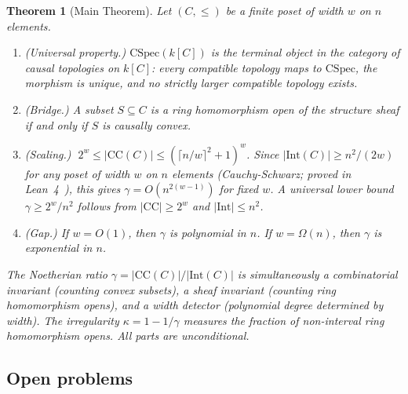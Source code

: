 \documentclass[11pt,a4paper]{article}
\theoremstyle{plain}
\newtheorem{theorem}{Theorem}[section]
\theoremstyle{definition}
\theoremstyle{remark}
\newcommand{\CSpec}{\mathrm{CSpec}}
\newcommand{\CC}{\mathrm{CC}}
\newcommand{\Int}{\mathrm{Int}}
\begin{document}
\begin{theorem}[Main Theorem]\label{thm:main}
Let $(C, \leq)$ be a finite poset of width $w$ on $n$ elements.
\begin{enumerate}[nosep]
\item \textup{(Universal property.)} $\CSpec(k[C])$ is the terminal object in the category of causal topologies on $k[C]$: every compatible topology maps to $\CSpec$, the morphism is unique, and no strictly larger compatible topology exists.
\item \textup{(Bridge.)} A subset $S \subseteq C$ is a ring homomorphism open of the structure sheaf if and only if $S$ is causally convex.
\item \textup{(Scaling.)} $\;2^w \leq |\CC(C)| \leq (\lceil n/w \rceil^2 + 1)^w$. Since $|\Int(C)| \geq n^2/(2w)$ for any poset of width $w$ on $n$ elements (Cauchy-Schwarz; proved in Lean~4~\cite{leanrepo}), this gives $\gamma = O(n^{2(w-1)})$ for fixed $w$. A universal lower bound $\gamma \geq 2^w / n^2$ follows from $|\CC| \geq 2^w$ and $|\Int| \leq n^2$.
\item \textup{(Gap.)} If $w = O(1)$, then $\gamma$ is polynomial in $n$. If $w = \Omega(n)$, then $\gamma$ is exponential in $n$.
\end{enumerate}
The Noetherian ratio $\gamma = |\CC(C)|/|\Int(C)|$ is simultaneously a combinatorial invariant (counting convex subsets), a sheaf invariant (counting ring homomorphism opens), and a width detector (polynomial degree determined by width). The irregularity $\kappa = 1 - 1/\gamma$ measures the fraction of non-interval ring homomorphism opens.
All parts are unconditional.
\end{theorem}

\subsection{Open problems}
\end{document}
